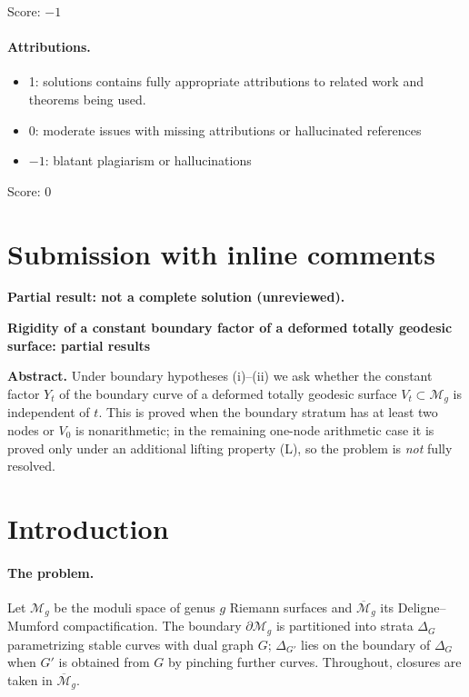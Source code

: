 \documentclass[11pt]{article}
\newcommand{\M}{\mathcal M}
\newcommand{\cl}[1]{\overline{#1}}
\theoremstyle{remark}
\begin{document}
\noindent Score: $-1$

\paragraph{Attributions.}
\begin{itemize}
	\item  1: solutions contains fully appropriate attributions
		to related work and theorems being used.
	\item  0: moderate issues with missing attributions or hallucinated references
	\item  $-1$: blatant plagiarism or hallucinations
\end{itemize}

\noindent Score: 0

\newpage
\section{Submission with inline comments}


\noindent\textbf{Partial result: not a complete solution (unreviewed).}\par

\begin{center}
\textbf{Rigidity of a constant boundary factor of a deformed
totally geodesic surface: partial results}
\end{center}

\noindent\textbf{Abstract.}
Under boundary hypotheses (i)--(ii) we ask whether the constant
factor \(Y_t\) of the boundary curve of a deformed totally geodesic
surface \(V_t\subset\M_g\) is independent of \(t\). This is proved
when the boundary stratum has at least two nodes or \(V_0\) is
nonarithmetic; in the remaining one-node arithmetic case
it is proved only under an additional lifting property (L), so the
problem is \emph{not} fully resolved.

\section{Introduction}

\paragraph{The problem.}
Let \(\M_g\) be the moduli space of genus \(g\) Riemann surfaces and
\(\cl{\M}_g\) its Deligne--Mumford compactification. The boundary
\(\partial\M_g\) is partitioned into strata \(\Delta_G\) parametrizing
stable curves with dual graph \(G\); \(\Delta_{G'}\) lies
on the boundary of \(\Delta_G\) when \(G'\) is obtained from \(G\) by
pinching further curves. Throughout, closures are taken in \(\cl{\M}_g\).
\end{document}
